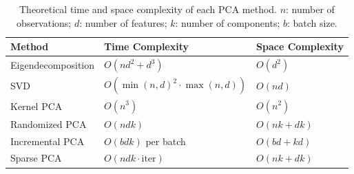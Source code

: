 \begin{table}[h]
\centering
\begin{tabular}{lll}
\hline
\textbf{Method} & \textbf{Time Complexity} & \textbf{Space Complexity} \\
\hline
Eigendecomposition & $O(nd^2 + d^3)$ & $O(d^2)$ \\
SVD               & $O(\min(n,d)^2 \cdot \max(n,d))$ & $O(nd)$ \\
Kernel PCA        & $O(n^3)$ & $O(n^2)$ \\
Randomized PCA    & $O(ndk)$ & $O(nk + dk)$ \\
Incremental PCA   & $O(bdk)$ per batch & $O(bd + kd)$ \\
Sparse PCA        & $O(ndk \cdot \text{iter})$ & $O(nk + dk)$ \\
\hline
\end{tabular}
\caption{Theoretical time and space complexity of each PCA method.
$n$: number of observations; $d$: number of features; $k$: number of
components; $b$: batch size.}
\label{tab:complexity}
\end{table}


